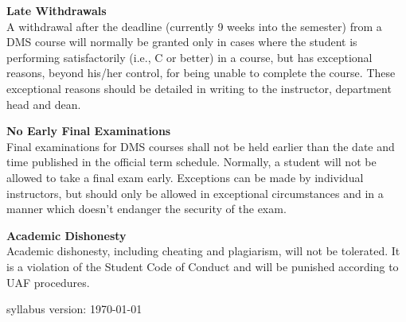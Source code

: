 \documentclass[12pt]{article}
\renewcommand{\emph}[1]{\textsf{\textbf{#1}}}
\newcommand{\localhead}[1]{\par\smallskip\textbf{#1}\nobreak\\}%
\def\subheading#1{\localhead{\emph{#1}}}
\begin{document}
\subheading{Late Withdrawals} 
A withdrawal after the deadline (currently 9 weeks into the semester) from a DMS course will normally be granted only in cases where the student is performing satisfactorily (i.e., C or better) in a course, but has exceptional reasons, beyond his/her control, for being unable to complete the course. These exceptional reasons should be detailed in writing to the instructor, department head and dean.

\subheading{No Early Final Examinations}
Final examinations for DMS courses shall not be held earlier than the date and time published in the official term schedule. Normally, a student will not be allowed to take a final exam early. Exceptions can be made by individual instructors, but should only be allowed in exceptional circumstances and in a manner which doesn't endanger the security of the exam.

\subheading{Academic Dishonesty}
Academic dishonesty, including cheating and plagiarism, will not be tolerated.  It is a violation of the Student Code of Conduct and will be punished according to UAF procedures.

\vfill
\hfill \scriptsize syllabus version: \today \normalsize
\end{document}
